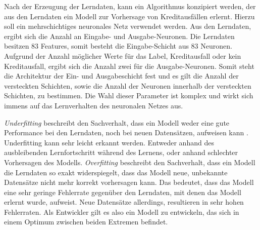 Nach der Erzeugung der Lerndaten, kann ein Algorithmus konzipiert werden, der aus den Lerndaten ein Modell zur Vorhersage von Kreditausfällen erlernt. Hierzu soll ein mehrschichtiges neuronales Netz verwendet werden. Aus den Lerndaten, ergibt sich die Anzahl an Eingabe- und Ausgabe-Neuronen. Die Lerndaten besitzen 83 Features, somit besteht die Eingabe-Schicht aus 83 Neuronen. Aufgrund der Anzahl möglicher Werte für das Label, Kreditausfall oder kein Kreditausfall, ergibt sich die Anzahl zwei für die Ausgabe-Neuronen. Somit steht die Architektur der Ein- und Ausgabeschicht fest und es gilt die Anzahl der versteckten Schichten, sowie die Anzahl der Neuronen innerhalb der versteckten Schichten, zu bestimmen. Die Wahl dieser Parameter ist komplex und wirkt sich immens auf das Lernverhalten des neuronalen Netzes aus. 

\begin{definition}
\begin{shaded}
\emph{Underfitting} beschreibt den Sachverhalt, dass ein Modell weder eine gute Performance bei den Lerndaten, noch bei neuen Datensätzen, aufweisen kann \cite{MM16}. Underfitting kann sehr leicht erkannt werden. Entweder anhand des ausbleibenden Lernfortschritt während des Lernens, oder anhand schlechter Vorhersagen des Modells.   
\emph{Overfitting} \cite[vgl. S.947 ff.]{SG17} beschreibt den Sachverhalt, dass ein Modell die Lerndaten so exakt widerspiegelt, dass das Modell neue, unbekannte Datensätze nicht mehr korrekt vorhersagen kann. Das bedeutet, dass das Modell eine sehr geringe Fehlerrate gegenüber den Lerndaten, mit denen das Modell erlernt wurde, aufweist. Neue Datensätze allerdings, resultieren in sehr hohen Fehlerraten. Als Entwickler gilt es also ein Modell zu entwickeln, das sich in einem Optimum zwischen beiden Extremen befindet. 
\label{def:fitting}
\end{shaded}
\end{definition}

